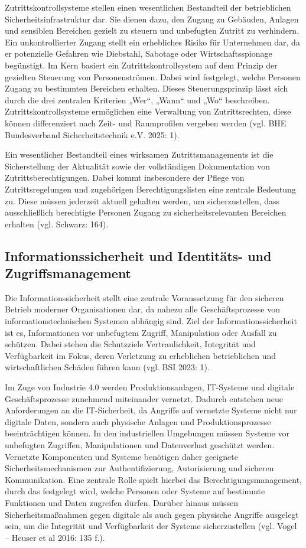 \documentclass[
  12pt,
  a4paper,
  oneside,
  headings=normal,
  numbers=noendperiod
]{scrreprt}
\numberwithin{equation}{chapter}
\begin{document}
Zutrittskontrollsysteme stellen einen wesentlichen Bestandteil der betrieblichen
Sicherheitsinfrastruktur dar. Sie dienen dazu, den Zugang zu Gebäuden, Anlagen
und sensiblen Bereichen gezielt zu steuern und unbefugten Zutritt zu verhindern.
Ein unkontrollierter Zugang stellt ein erhebliches Risiko für Unternehmen dar, da
er potenzielle Gefahren wie Diebstahl, Sabotage oder Wirtschaftsspionage
begünstigt. Im Kern basiert ein Zutrittskontrollsystem auf dem Prinzip der
gezielten Steuerung von Personenströmen. Dabei wird festgelegt, welche Personen
Zugang zu bestimmten Bereichen erhalten. Dieses Steuerungsprinzip lässt sich
durch die drei zentralen Kriterien „Wer“, „Wann“ und „Wo“ beschreiben.
Zutrittskontrollsysteme ermöglichen eine Verwaltung von Zutrittsrechten, diese
können differenziert nach Zeit- und Raumprofilen vergeben werden (vgl. BHE
Bundesverband Sicherheitstechnik e.V. 2025: 1).

Ein wesentlicher Bestandteil eines wirksamen Zutrittsmanagements ist die
Sicherstellung der Aktualität sowie der vollständigen Dokumentation von
Zutrittsberechtigungen. Dabei kommt insbesondere der Pflege von
Zutrittsregelungen und zugehörigen Berechtigungslisten eine zentrale Bedeutung
zu. Diese müssen jederzeit aktuell gehalten werden, um sicherzustellen, dass
ausschließlich berechtigte Personen Zugang zu sicherheitsrelevanten Bereichen
erhalten (vgl. Schwarz: 164).

\subsection{Informationssicherheit und Identitäts- und Zugriffsmanagement}

Die Informationssicherheit stellt eine zentrale Voraussetzung für den sicheren
Betrieb moderner Organisationen dar, da nahezu alle Geschäftsprozesse von
informationstechnischen Systemen abhängig sind. Ziel der Informationssicherheit
ist es, Informationen vor unbefugtem Zugriff, Manipulation oder Ausfall zu
schützen. Dabei stehen die Schutzziele Vertraulichkeit, Integrität und
Verfügbarkeit im Fokus, deren Verletzung zu erheblichen betrieblichen und
wirtschaftlichen Schäden führen kann (vgl. BSI 2023: 1).

Im Zuge von Industrie 4.0 werden Produktionsanlagen, IT-Systeme und digitale
Geschäftsprozesse zunehmend miteinander vernetzt. Dadurch entstehen neue
Anforderungen an die IT-Sicherheit, da Angriffe auf vernetzte Systeme nicht nur
digitale Daten, sondern auch physische Anlagen und Produktionsprozesse
beeinträchtigen können. In den industriellen Umgebungen müssen Systeme vor
unbefugten Zugriffen, Manipulationen und Datenverlust geschützt werden.
Vernetzte Komponenten und Systeme benötigen daher geeignete
Sicherheitsmechanismen zur Authentifizierung, Autorisierung und sicheren
Kommunikation. Eine zentrale Rolle spielt hierbei das Berechtigungsmanagement,
durch das festgelegt wird, welche Personen oder Systeme auf bestimmte Funktionen
und Daten zugreifen dürfen. Darüber hinaus müssen Sicherheitsmaßnahmen gegen
digitale als auch gegen physische Angriffe ausgelegt sein, um die Integrität und
Verfügbarkeit der Systeme sicherzustellen (vgl. Vogel -- Heuser et al 2016:
135 f.).
\end{document}
